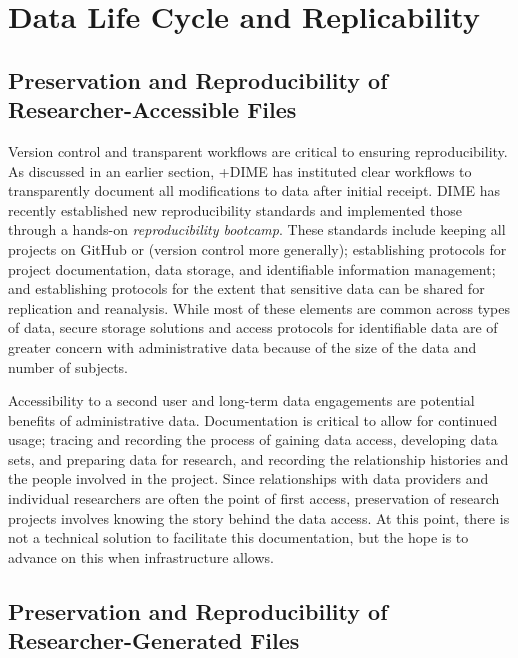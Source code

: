 \documentclass[
]{book}
\begin{document}
\hypertarget{data-life-cycle-and-replicability-5}{%
\section{Data Life Cycle and Replicability}\label{data-life-cycle-and-replicability-5}}

\hypertarget{preservation-and-reproducibility-of-researcher-accessible-files-6}{%
\subsection{Preservation and Reproducibility of Researcher-Accessible Files}\label{preservation-and-reproducibility-of-researcher-accessible-files-6}}

Version control and transparent workflows are critical to ensuring reproducibility. As discussed in an earlier section, +DIME\textbar{} has instituted clear workflows to transparently document all modifications to data after initial receipt. DIME has recently established new reproducibility standards and implemented those through a hands-on \emph{reproducibility bootcamp}. These standards include keeping all projects on GitHub or (version control more generally); establishing protocols for project documentation, data storage, and identifiable information management; and establishing protocols for the extent that sensitive data can be shared for replication and reanalysis. While most of these elements are common across types of data, secure storage solutions and access protocols for identifiable data are of greater concern with administrative data because of the size of the data and number of subjects.

Accessibility to a second user and long-term data engagements are potential benefits of administrative data. Documentation is critical to allow for continued usage; tracing and recording the process of gaining data access, developing data sets, and preparing data for research, and recording the relationship histories and the people involved in the project. Since relationships with data providers and individual researchers are often the point of first access, preservation of research projects involves knowing the story behind the data access. At this point, there is not a technical solution to facilitate this documentation, but the hope is to advance on this when infrastructure allows.

\hypertarget{preservation-and-reproducibility-of-researcher-generated-files-5}{%
\subsection{Preservation and Reproducibility of Researcher-Generated Files}\label{preservation-and-reproducibility-of-researcher-generated-files-5}}
\end{document}
